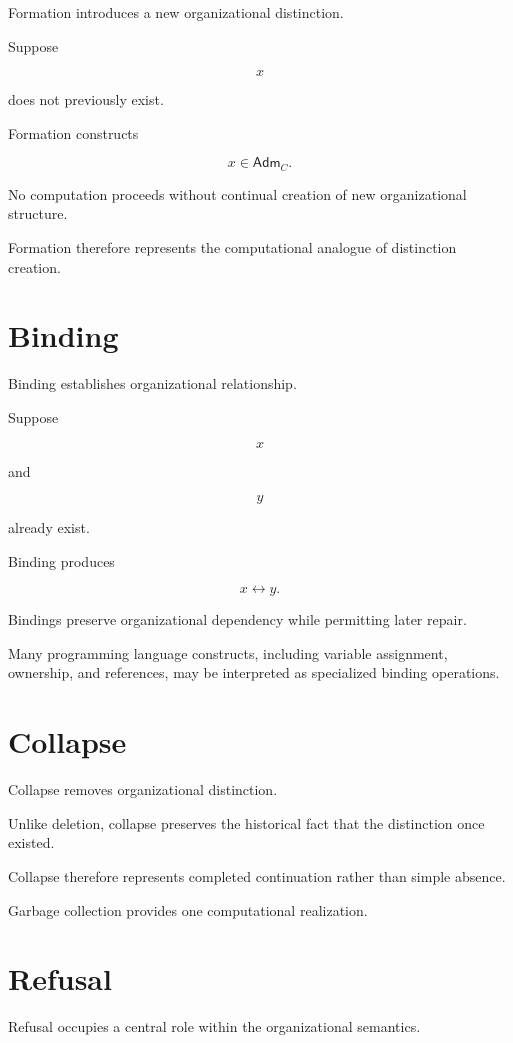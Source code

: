\documentclass[11pt,oneside]{book}
\numberwithin{equation}{chapter}
\theoremstyle{definition}
\theoremstyle{plain}
\newcommand{\Adm}{\mathsf{Adm}}
\begin{document}
Formation introduces a new organizational distinction.

Suppose

\[
x
\]

does not previously exist.

Formation constructs

\[
x
\in
\Adm_C.
\]

No computation proceeds without continual creation of new organizational
structure.

Formation therefore represents the computational analogue of distinction
creation.

\section{Binding}

Binding establishes organizational relationship.

Suppose

\[
x
\]

and

\[
y
\]

already exist.

Binding produces

\[
x
\leftrightarrow
y.
\]

Bindings preserve organizational dependency while permitting later
repair.

Many programming language constructs, including variable assignment,
ownership, and references, may be interpreted as specialized binding
operations.

\section{Collapse}

Collapse removes organizational distinction.

Unlike deletion, collapse preserves the historical fact that the
distinction once existed.

Collapse therefore represents completed continuation rather than simple
absence.

Garbage collection provides one computational realization.

\section{Refusal}

Refusal occupies a central role within the organizational semantics.
\end{document}

